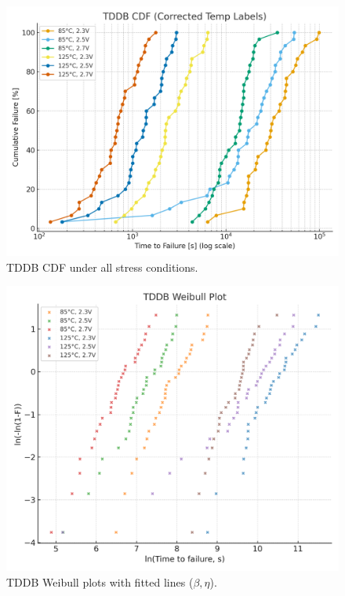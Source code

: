 \documentclass[conference]{IEEEtran}
\begin{document}
\begin{figure}[t]
  \centering
  \includegraphics[width=\linewidth]{figures/fig4_tddb_cdf.png}
  \caption{TDDB CDF under all stress conditions.}
  \label{fig:tddb_cdf}
\end{figure}

\begin{figure}[t]
  \centering
  \includegraphics[width=\linewidth]{figures/fig4_tddb_weibull.png}
  \caption{TDDB Weibull plots with fitted lines (\(\beta,\eta\)).}
  \label{fig:tddb_weibull}
\end{figure}
\end{document}
